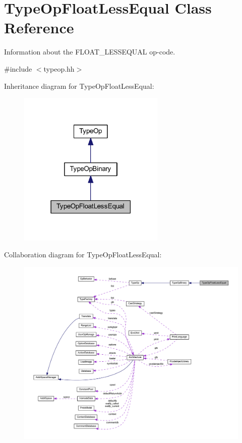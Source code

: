 \hypertarget{class_type_op_float_less_equal}{}\section{Type\+Op\+Float\+Less\+Equal Class Reference}
\label{class_type_op_float_less_equal}


Information about the F\+L\+O\+A\+T\+\_\+\+L\+E\+S\+S\+E\+Q\+U\+AL op-\/code.  




{\ttfamily \#include $<$typeop.\+hh$>$}



Inheritance diagram for Type\+Op\+Float\+Less\+Equal\+:
\nopagebreak
\begin{figure}[H]
\begin{center}
\leavevmode
\includegraphics[width=198pt]{class_type_op_float_less_equal__inherit__graph}
\end{center}
\end{figure}


Collaboration diagram for Type\+Op\+Float\+Less\+Equal\+:
\nopagebreak
\begin{figure}[H]
\begin{center}
\leavevmode
\includegraphics[width=350pt]{class_type_op_float_less_equal__coll__graph}
\end{center}
\end{figure}
